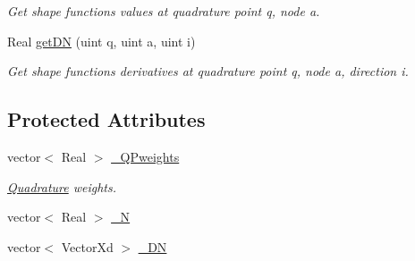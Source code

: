 \begin{DoxyCompactItemize}
\begin{DoxyCompactList}\small\item\em Get shape functions values at quadrature point q, node a. \item\end{DoxyCompactList}\item 
\hypertarget{classvoom_1_1_f_egeom_element_a0f55891efa8658fa3a66d7c0d69fb40e}{
Real \hyperlink{classvoom_1_1_f_egeom_element_a0f55891efa8658fa3a66d7c0d69fb40e}{getDN} (uint q, uint a, uint i)}
\label{classvoom_1_1_f_egeom_element_a0f55891efa8658fa3a66d7c0d69fb40e}

\begin{DoxyCompactList}\small\item\em Get shape functions derivatives at quadrature point q, node a, direction i. \item\end{DoxyCompactList}\end{DoxyCompactItemize}
\subsection*{Protected Attributes}
\begin{DoxyCompactItemize}
\item 
\hypertarget{classvoom_1_1_f_egeom_element_aa2f4225cec59380dfc9735bb68fc2e9a}{
vector$<$ Real $>$ \hyperlink{classvoom_1_1_f_egeom_element_aa2f4225cec59380dfc9735bb68fc2e9a}{\_\-QPweights}}
\label{classvoom_1_1_f_egeom_element_aa2f4225cec59380dfc9735bb68fc2e9a}

\begin{DoxyCompactList}\small\item\em \hyperlink{classvoom_1_1_quadrature}{Quadrature} weights. \item\end{DoxyCompactList}\item 
vector$<$ Real $>$ \hyperlink{classvoom_1_1_f_egeom_element_a944e0317c44621247dc303eecbc1b43f}{\_\-N}
\item 
vector$<$ VectorXd $>$ \hyperlink{classvoom_1_1_f_egeom_element_a1dd12a09866e90fe8738bcea2267a835}{\_\-DN}
\end{DoxyCompactItemize}


